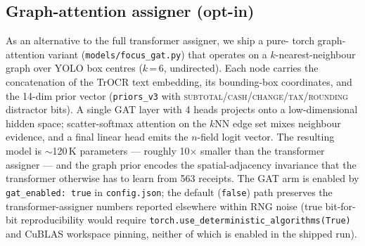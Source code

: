 \documentclass[conference]{IEEEtran}
\begin{document}
\subsection{Graph-attention assigner (opt-in)}\label{sec:gat}

As an alternative to the full transformer assigner, we ship a pure-
torch graph-attention variant (\texttt{models/focus\_gat.py}) that
operates on a $k$-nearest-neighbour graph over YOLO box centres
($k$\,=\,6, undirected).  Each node carries the concatenation of
the TrOCR text embedding, its bounding-box coordinates, and the
14-dim prior vector (\texttt{priors\_v3} with
\textsc{subtotal}/\textsc{cash}/\textsc{change}/\textsc{tax}/\textsc{rounding}
distractor bits).  A single GAT layer with 4 heads projects onto
a low-dimensional hidden space; scatter-softmax attention on the $k$NN edge
set mixes neighbour evidence, and a final linear head emits the
$n$-field logit vector.  The resulting model is $\sim$120\,K
parameters --- roughly 10$\times$ smaller than the transformer
assigner --- and the graph prior encodes the spatial-adjacency
invariance that the transformer otherwise has to learn from
563 receipts.  The GAT arm is enabled by \texttt{gat\_enabled: true} in
\texttt{config.json}; the default (\texttt{false}) path preserves
the transformer-assigner numbers reported elsewhere within RNG noise
(true bit-for-bit reproducibility would require
\texttt{torch.use\_deterministic\_algorithms(True)} and CuBLAS
workspace pinning, neither of which is enabled in the shipped run).
\end{document}
